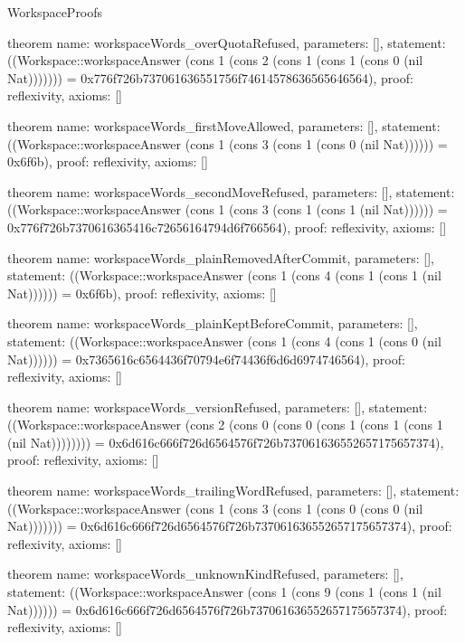 \begin{lexlean}{WorkspaceProofs}
\begin{semanticmodule}
theorem{
  name: workspaceWords_overQuotaRefused,
  parameters: [],
  statement: ((Workspace::workspaceAnswer (cons 1 (cons 2 (cons 1 (cons 1 (cons 0 (nil Nat))))))) = 0x776f726b737061636551756f74614578636565646564),
  proof: reflexivity{},
  axioms: []
}

theorem{
  name: workspaceWords_firstMoveAllowed,
  parameters: [],
  statement: ((Workspace::workspaceAnswer (cons 1 (cons 3 (cons 1 (cons 0 (nil Nat)))))) = 0x6f6b),
  proof: reflexivity{},
  axioms: []
}

theorem{
  name: workspaceWords_secondMoveRefused,
  parameters: [],
  statement: ((Workspace::workspaceAnswer (cons 1 (cons 3 (cons 1 (cons 1 (nil Nat)))))) = 0x776f726b7370616365416c72656164794d6f766564),
  proof: reflexivity{},
  axioms: []
}

theorem{
  name: workspaceWords_plainRemovedAfterCommit,
  parameters: [],
  statement: ((Workspace::workspaceAnswer (cons 1 (cons 4 (cons 1 (cons 1 (nil Nat)))))) = 0x6f6b),
  proof: reflexivity{},
  axioms: []
}

theorem{
  name: workspaceWords_plainKeptBeforeCommit,
  parameters: [],
  statement: ((Workspace::workspaceAnswer (cons 1 (cons 4 (cons 1 (cons 0 (nil Nat)))))) = 0x7365616c6564436f70794e6f74436f6d6d6974746564),
  proof: reflexivity{},
  axioms: []
}

theorem{
  name: workspaceWords_versionRefused,
  parameters: [],
  statement: ((Workspace::workspaceAnswer (cons 2 (cons 0 (cons 0 (cons 1 (cons 1 (cons 1 (nil Nat)))))))) = 0x6d616c666f726d6564576f726b737061636552657175657374),
  proof: reflexivity{},
  axioms: []
}

theorem{
  name: workspaceWords_trailingWordRefused,
  parameters: [],
  statement: ((Workspace::workspaceAnswer (cons 1 (cons 3 (cons 1 (cons 0 (cons 0 (nil Nat))))))) = 0x6d616c666f726d6564576f726b737061636552657175657374),
  proof: reflexivity{},
  axioms: []
}

theorem{
  name: workspaceWords_unknownKindRefused,
  parameters: [],
  statement: ((Workspace::workspaceAnswer (cons 1 (cons 9 (cons 1 (cons 1 (nil Nat)))))) = 0x6d616c666f726d6564576f726b737061636552657175657374),
  proof: reflexivity{},
  axioms: []
}
\end{semanticmodule}
\end{lexlean}
